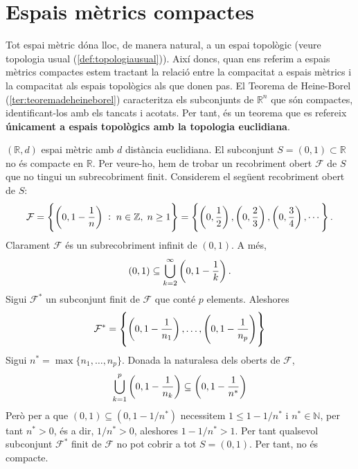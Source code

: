 \documentclass[../main.tex]{subfiles}
\begin{document}
\section{Espais mètrics compactes}

Tot espai mètric dóna lloc, de manera natural, a un espai topològic (veure topologia usual (\ref{def:topologiausual})). Així doncs, quan ens referim a espais mètrics compactes estem tractant la relació entre la compacitat a espais mètrics i la compacitat als espais topològics als que donen pas. El Teorema de Heine-Borel (\ref{ter:teoremadeheineborel}) caracteritza els subconjunts de $\mathbb{R}^n$ que són compactes, identificant-los amb els tancats i acotats. Per tant, és un teorema que es refereix \textbf{únicament a espais topològics amb la topologia euclidiana}.

\begin{ej}
\label{ej:espaimetriccompacte} $(\mathbb{R},d)$ espai mètric amb $d$ distància euclidiana. El subconjunt $S = (0,1)\subset\mathbb{R}$ no és compacte en $\mathbb{R}$. Per veure-ho, hem de trobar un recobriment obert $\mathcal{F}$ de $S$ que no tingui un subrecobriment finit.  Considerem el següent recobriment obert de $S$:
\begin{equation}
    \notag
    \mathcal{F} = \left\{\left(0,1-\frac{1}{n}\right)\;:\;n\in\mathbb{Z},\;n\geq 1\right\} = \left\{\left(0,\frac{1}{2}\right),\left(0,\frac{2}{3}\right),\left(0,\frac{3}{4}\right),\cdots\right\}. 
\end{equation}
Clarament $\mathcal{F}$ és un subrecobriment infinit de $(0,1)$. A més,
\begin{equation}
    \notag
    (0,1)\subseteq\bigcup_{k=2}^\infty \left(0,1-\frac{1}{k}\right) .
\end{equation}
Sigui $\mathcal{F}^*$ un subconjunt finit de $\mathcal{F}$ que conté $p$ elements. Aleshores 
\begin{equation}
    \notag
    \mathcal{F}^* = \left\{\left(0,1-\frac{1}{n_1}\right),\ldots,\left(0,1-\frac{1}{n_p}\right)\right\}
\end{equation}
Sigui $n^* = \max\{n_1,\ldots,n_p\}$. Donada la naturalesa dels oberts de $\mathcal{F}$, 
\begin{equation}
    \notag
    \bigcup_{k=1}^p\left(0,1-\frac{1}{n_k}\right)\subseteq \left(0,1-\frac{1}{n^*}\right)
\end{equation}
Però per a que $(0,1)\subseteq (0,1-1/n^*)$ necessitem $1\leq 1-1/n^*$ i $n^*\in\mathbb{N}$, per tant $n^*>0$, és a dir, $1/n^*>0$, aleshores $1-1/n^*>1$. Per tant qualsevol subconjunt $\mathcal{F}^*$ finit de $\mathcal{F}$ no pot cobrir a tot $S = (0,1)$. Per tant, no és compacte.
\end{ej}
\end{document}
